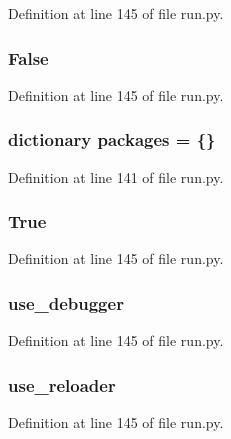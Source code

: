 Definition at line 145 of file run.\+py.

\subsubsection[{\texorpdfstring{False}{False}}]{\setlength{\rightskip}{0pt plus 5cm}False}\hypertarget{namespacerun_a36cde68b055f3f2ee671020af4ccf4e2}{}\label{namespacerun_a36cde68b055f3f2ee671020af4ccf4e2}


Definition at line 145 of file run.\+py.

\subsubsection[{\texorpdfstring{packages}{packages}}]{\setlength{\rightskip}{0pt plus 5cm}dictionary packages = \{\}}\hypertarget{namespacerun_ab966ab9458ccaf3792ee29eb175a235c}{}\label{namespacerun_ab966ab9458ccaf3792ee29eb175a235c}


Definition at line 141 of file run.\+py.

\subsubsection[{\texorpdfstring{True}{True}}]{\setlength{\rightskip}{0pt plus 5cm}True}\hypertarget{namespacerun_a643a20c0c59588a0f741a6095e2025fd}{}\label{namespacerun_a643a20c0c59588a0f741a6095e2025fd}


Definition at line 145 of file run.\+py.

\subsubsection[{\texorpdfstring{use\+\_\+debugger}{use_debugger}}]{\setlength{\rightskip}{0pt plus 5cm}use\+\_\+debugger}\hypertarget{namespacerun_a84ec172ec1d54c6a54e6e648c35c934f}{}\label{namespacerun_a84ec172ec1d54c6a54e6e648c35c934f}


Definition at line 145 of file run.\+py.

\subsubsection[{\texorpdfstring{use\+\_\+reloader}{use_reloader}}]{\setlength{\rightskip}{0pt plus 5cm}use\+\_\+reloader}\hypertarget{namespacerun_a33f3d888c60d659e953c90c18f532678}{}\label{namespacerun_a33f3d888c60d659e953c90c18f532678}


Definition at line 145 of file run.\+py.

